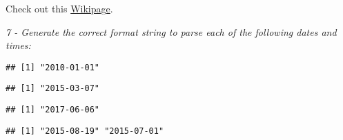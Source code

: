 \documentclass[]{article}
\newenvironment{Shaded}{\begin{snugshade}}{\end{snugshade}}
\newcommand{\KeywordTok}[1]{\textcolor[rgb]{0.13,0.29,0.53}{\textbf{#1}}}
\newcommand{\StringTok}[1]{\textcolor[rgb]{0.31,0.60,0.02}{#1}}
\newcommand{\NormalTok}[1]{#1}
\theoremstyle{definition}
\theoremstyle{definition}
\theoremstyle{definition}
\theoremstyle{remark}
\begin{document}
Check out this
\href{https://en.wikipedia.org/wiki/Character_encoding}{Wikipage}.

\emph{7 - Generate the correct format string to parse each of the
following dates and times:}

\begin{Shaded}
\end{Shaded}

\begin{verbatim}
## [1] "2010-01-01"
\end{verbatim}

\begin{Shaded}
\end{Shaded}

\begin{verbatim}
## [1] "2015-03-07"
\end{verbatim}

\begin{Shaded}
\end{Shaded}

\begin{verbatim}
## [1] "2017-06-06"
\end{verbatim}

\begin{Shaded}
\end{Shaded}

\begin{verbatim}
## [1] "2015-08-19" "2015-07-01"
\end{verbatim}
\end{document}

